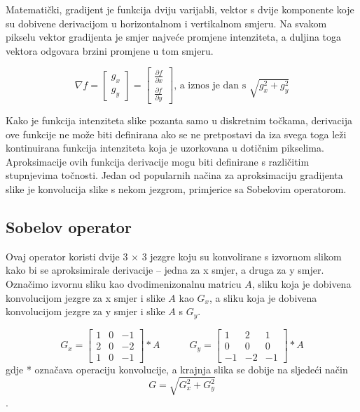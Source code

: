\documentclass[times, utf8, zavrsni]{fer}
\begin{document}

Matematički, gradijent je funkcija dviju varijabli, vektor s dvije komponente koje su dobivene
derivacijom u horizontalnom i vertikalnom smjeru. Na svakom pikselu vektor gradijenta je smjer 
najveće promjene intenziteta, a duljina toga vektora odgovara brzini promjene u tom smjeru.

\[
\nabla f = \left[ \begin{array}{c} g_x \\ g_y \end{array}\right]
 = \left[ \begin{array}{c} \frac{\partial f}{\partial x} \\ \frac{\partial f}{\partial y} \end{array}\right]
 \textrm{, a iznos je dan s  } \sqrt{g_x^2 + g_y^2}
\]

\bigbreak

Kako je funkcija intenziteta slike pozanta samo u diskretnim točkama, derivacija ove funkcije 
ne može biti definirana ako se ne pretpostavi da iza svega toga leži kontinuirana funkcija 
intenziteta koja je uzorkovana u dotičnim pikselima. Aproksimacije ovih funkcija derivacije 
mogu biti definirane s različitim stupnjevima točnosti. Jedan od popularnih načina za 
aproksimaciju gradijenta slike je konvolucija slike s nekom jezgrom, primjerice sa Sobelovim operatorom.

\newpage

\subsection{Sobelov operator}

Ovaj operator koristi dvije 3 \(\times\) 3 jezgre koju su konvolirane s izvornom slikom kako bi se aproksimirale 
derivacije – jedna za x smjer, a druga za y smjer. Označimo izvornu sliku kao dvodimenizonalnu matricu \(A\), sliku
koja je dobivena konvolucijom jezgre za x smjer i slike \(A\) kao \(G_x\), a sliku koja je dobivena konvolucijom 
jezgre za y smjer i slike \(A\) s \(G_y\).

\[G_x = 
\begin{bmatrix} 
1 & 0 & -1\\ 
2 & 0 & -2\\ 
1 & 0 & -1 
\end{bmatrix}
 * A
  \quad\quad\quad
 G_y = 
\begin{bmatrix} 
 1 & 2 & 1\\ 
 0 & 0 & 0\\ 
 -1 & -2 & -1
\end{bmatrix}
 * A
\]
\bigbreak
gdje * označava operaciju konvolucije, a krajnja slika se dobije na sljedeći način 
\[
G = \sqrt{G_x^2 + G_y^2}
\].
\end{document}
